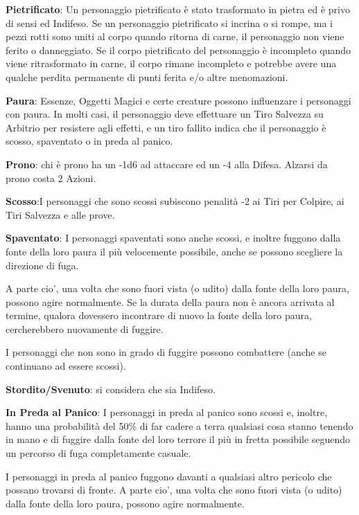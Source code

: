 \documentclass[a4paper,11pt,twoside,openany]{book}
\begin{document}
\textbf{Pietrificato}: Un personaggio pietrificato è stato trasformato in pietra ed è privo di sensi ed Indifeso. Se un personaggio pietrificato si incrina o si rompe, ma i pezzi rotti sono uniti al corpo quando ritorna di carne, il personaggio non viene ferito o danneggiato. Se il corpo pietrificato del personaggio è incompleto quando viene ritrasformato in carne, il corpo rimane incompleto e potrebbe avere una qualche perdita permanente di punti ferita e/o altre menomazioni.

\textbf{Paura}: Essenze, Oggetti Magici e certe creature possono influenzare i personaggi con paura. In molti casi, il personaggio deve effettuare un Tiro Salvezza su Arbitrio per resistere agli effetti, e un tiro fallito indica che il personaggio è scosso, spaventato o in preda al panico.

\textbf{Prono}: chi è prono ha un -1d6 ad attaccare ed un -4 alla Difesa. Alzarsi da prono costa 2 Azioni.

\textbf{Scosso}:I personaggi che sono scossi subiscono penalità -2 ai Tiri per Colpire, ai Tiri Salvezza e alle prove.

\textbf{Spaventato}: I personaggi spaventati sono anche scossi, e inoltre fuggono dalla fonte della loro paura il più velocemente possibile, anche se possono scegliere la direzione di fuga.

A parte cio', una volta che sono fuori vista (o udito) dalla fonte della loro paura, possono agire normalmente. Se la durata della paura non è ancora arrivata al termine, qualora dovessero incontrare di nuovo la fonte della loro paura, cercherebbero nuovamente di fuggire.

I personaggi che non sono in grado di fuggire possono combattere (anche se continuano ad essere scossi).

\textbf{Stordito/Svenuto}: si considera che sia Indifeso.

\textbf{In Preda al Panico}: I personaggi in preda al panico sono scossi e, inoltre, hanno una probabilità del 50\% di far cadere a terra qualsiasi cosa stanno tenendo in mano e di fuggire dalla fonte del loro terrore il più in fretta possibile seguendo un percorso di fuga completamente casuale.

I personaggi in preda al panico fuggono davanti a qualsiasi altro pericolo che possano trovarsi di fronte. A parte cio', una volta che sono fuori vista (o udito) dalla fonte della loro paura, possono agire normalmente.
\end{document}

